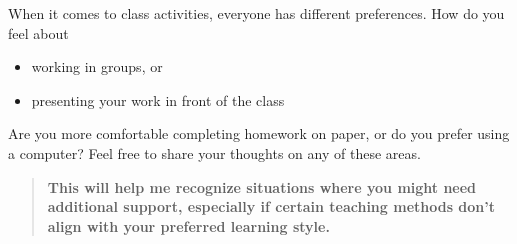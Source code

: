 \documentclass{ximera}
\author{Bart Snapp}
\begin{document}
\begin{question}

    When it comes to class activities, everyone has different preferences. How
    do you feel about
    \begin{itemize}
        \item working in groups, or
        \item presenting your work in front of the class
    \end{itemize}
    Are you more comfortable completing homework on paper, or do you prefer
    using a computer? Feel free to share your thoughts on
    any of these areas.
    
    \begin{quote}
    \textbf{This will help me recognize situations where you might
    need additional support, especially if certain teaching methods don’t align
    with your preferred learning style.}
    \end{quote}

    \begin{freeResponse}
    \end{freeResponse}
\end{question}
\end{document}
